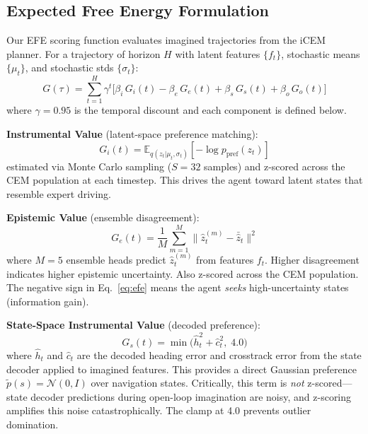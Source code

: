 \documentclass[conference]{IEEEtran}
\begin{document}
\subsection{Expected Free Energy Formulation}

Our EFE scoring function evaluates imagined trajectories from the iCEM planner. For a trajectory of horizon $H$ with latent features $\{f_t\}$, stochastic means $\{\mu_t\}$, and stochastic stds $\{\sigma_t\}$:
\begin{equation}
\boxed{
    G(\tau) = \sum_{t=1}^{H} \gamma^t \Big[ \beta_i \, G_i(t) - \beta_e \, G_e(t) + \beta_s \, G_s(t) + \beta_o \, G_o(t) \Big]
}
\label{eq:efe}
\end{equation}
where $\gamma = 0.95$ is the temporal discount and each component is defined below.

\textbf{Instrumental Value} (latent-space preference matching):
\begin{equation}
    G_i(t) = \mathbb{E}_{q(z_t | \mu_t, \sigma_t)}[-\log p_{\text{pref}}(z_t)]
\end{equation}
estimated via Monte Carlo sampling ($S{=}32$ samples) and z-scored across the CEM population at each timestep. This drives the agent toward latent states that resemble expert driving.

\textbf{Epistemic Value} (ensemble disagreement):
\begin{equation}
    G_e(t) = \frac{1}{M} \sum_{m=1}^{M} \| \hat{z}_t^{(m)} - \bar{\hat{z}}_t \|^2
\end{equation}
where $M{=}5$ ensemble heads predict $\hat{z}_t^{(m)}$ from features $f_t$. Higher disagreement indicates higher epistemic uncertainty. Also z-scored across the CEM population. The negative sign in Eq.~\ref{eq:efe} means the agent \emph{seeks} high-uncertainty states (information gain).

\textbf{State-Space Instrumental Value} (decoded preference):
\begin{equation}
    G_s(t) = \min\Big(\hat{h}_t^2 + \hat{c}_t^2, \; 4.0\Big)
\end{equation}
where $\hat{h}_t$ and $\hat{c}_t$ are the decoded heading error and crosstrack error from the state decoder applied to imagined features. This provides a direct Gaussian preference $\tilde{p}(s) = \mathcal{N}(0, I)$ over navigation states. Critically, this term is \emph{not} z-scored---state decoder predictions during open-loop imagination are noisy, and z-scoring amplifies this noise catastrophically. The clamp at 4.0 prevents outlier domination.
\end{document}
